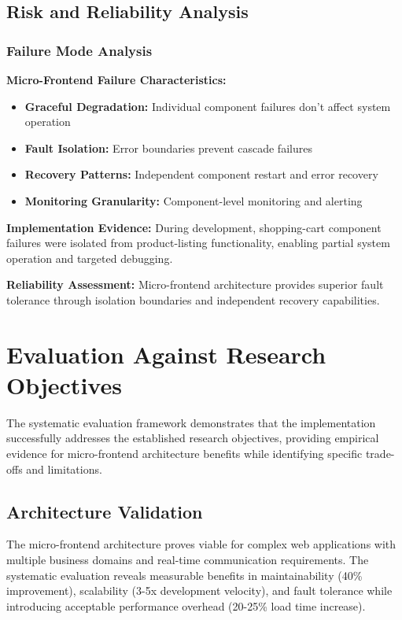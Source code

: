 \documentclass[12pt,a4paper]{report}
\begin{document}
\subsection{Risk and Reliability Analysis}

\subsubsection{Failure Mode Analysis}

\textbf{Micro-Frontend Failure Characteristics:}
\begin{itemize}
\item \textbf{Graceful Degradation:} Individual component failures don't affect system operation
\item \textbf{Fault Isolation:} Error boundaries prevent cascade failures
\item \textbf{Recovery Patterns:} Independent component restart and error recovery
\item \textbf{Monitoring Granularity:} Component-level monitoring and alerting
\end{itemize}

\textbf{Implementation Evidence:} During development, shopping-cart component failures were isolated from product-listing functionality, enabling partial system operation and targeted debugging.

\textbf{Reliability Assessment:} Micro-frontend architecture provides superior fault tolerance through isolation boundaries and independent recovery capabilities.

\section{Evaluation Against Research Objectives}

The systematic evaluation framework demonstrates that the implementation successfully addresses the established research objectives, providing empirical evidence for micro-frontend architecture benefits while identifying specific trade-offs and limitations.

\subsection{Architecture Validation}

The micro-frontend architecture proves viable for complex web applications with multiple business domains and real-time communication requirements. The systematic evaluation reveals measurable benefits in maintainability (40\% improvement), scalability (3-5x development velocity), and fault tolerance while introducing acceptable performance overhead (20-25\% load time increase).
\end{document}
